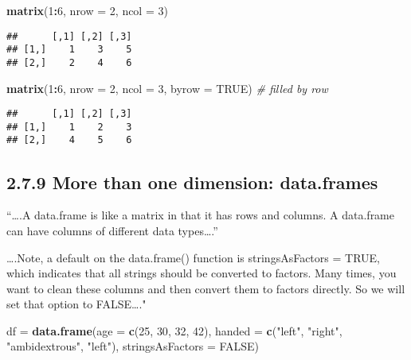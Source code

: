 \documentclass[]{article}
\newenvironment{Shaded}{\begin{snugshade}}{\end{snugshade}}
\newcommand{\CommentTok}[1]{\textcolor[rgb]{0.56,0.35,0.01}{\textit{#1}}}
\newcommand{\DataTypeTok}[1]{\textcolor[rgb]{0.13,0.29,0.53}{#1}}
\newcommand{\DecValTok}[1]{\textcolor[rgb]{0.00,0.00,0.81}{#1}}
\newcommand{\KeywordTok}[1]{\textcolor[rgb]{0.13,0.29,0.53}{\textbf{#1}}}
\newcommand{\NormalTok}[1]{#1}
\newcommand{\OperatorTok}[1]{\textcolor[rgb]{0.81,0.36,0.00}{\textbf{#1}}}
\newcommand{\OtherTok}[1]{\textcolor[rgb]{0.56,0.35,0.01}{#1}}
\newcommand{\StringTok}[1]{\textcolor[rgb]{0.31,0.60,0.02}{#1}}
\begin{document}
\begin{Shaded}
\begin{Highlighting}[]
\KeywordTok{matrix}\NormalTok{(}\DecValTok{1}\OperatorTok{:}\DecValTok{6}\NormalTok{, }\DataTypeTok{nrow =} \DecValTok{2}\NormalTok{, }\DataTypeTok{ncol =} \DecValTok{3}\NormalTok{) }
\end{Highlighting}
\end{Shaded}

\begin{verbatim}
##      [,1] [,2] [,3]
## [1,]    1    3    5
## [2,]    2    4    6
\end{verbatim}

\begin{Shaded}
\begin{Highlighting}[]
\KeywordTok{matrix}\NormalTok{(}\DecValTok{1}\OperatorTok{:}\DecValTok{6}\NormalTok{, }\DataTypeTok{nrow =} \DecValTok{2}\NormalTok{, }\DataTypeTok{ncol =} \DecValTok{3}\NormalTok{, }\DataTypeTok{byrow =} \OtherTok{TRUE}\NormalTok{) }\CommentTok{# filled by row}
\end{Highlighting}
\end{Shaded}

\begin{verbatim}
##      [,1] [,2] [,3]
## [1,]    1    2    3
## [2,]    4    5    6
\end{verbatim}

\hypertarget{more-than-one-dimension-data.frames}{%
\subsection{2.7.9 More than one dimension:
data.frames}\label{more-than-one-dimension-data.frames}}

``\ldots{}.A data.frame is like a matrix in that it has rows and
columns. A data.frame can have columns of different data
types\ldots{}.''

\ldots{}.Note, a default on the data.frame() function is
stringsAsFactors = TRUE, which indicates that all strings should be
converted to factors. Many times, you want to clean these columns and
then convert them to factors directly. So we will set that option to
FALSE\ldots{}."

\begin{Shaded}
\begin{Highlighting}[]
\NormalTok{df =}\StringTok{ }\KeywordTok{data.frame}\NormalTok{(}\DataTypeTok{age =} \KeywordTok{c}\NormalTok{(}\DecValTok{25}\NormalTok{, }\DecValTok{30}\NormalTok{, }\DecValTok{32}\NormalTok{, }\DecValTok{42}\NormalTok{), }
                \DataTypeTok{handed =} \KeywordTok{c}\NormalTok{(}\StringTok{"left"}\NormalTok{, }\StringTok{"right"}\NormalTok{, }\StringTok{"ambidextrous"}\NormalTok{, }\StringTok{"left"}\NormalTok{), }
                \DataTypeTok{stringsAsFactors =} \OtherTok{FALSE}\NormalTok{)}
\end{Highlighting}
\end{Shaded}
\end{document}
